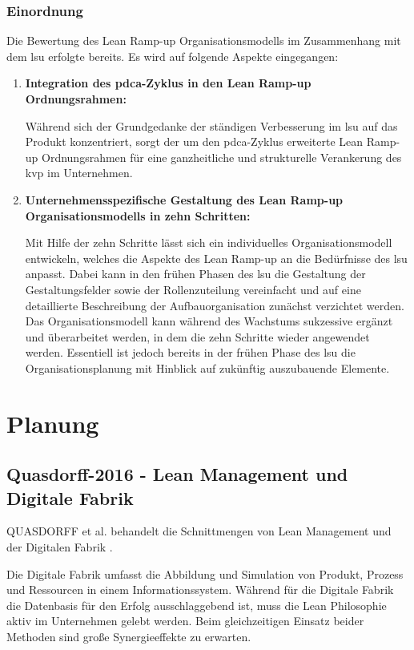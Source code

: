 \subsubsection{Einordnung}
Die Bewertung des Lean Ramp-up Organisationsmodells im Zusammenhang mit dem \gls{lsu} erfolgte bereits. Es wird auf folgende Aspekte eingegangen: 
\begin{enumerate}
 \item \textbf{Integration des \gls{pdca}-Zyklus in den Lean Ramp-up Ordnungsrahmen: }

 
 Während sich der Grundgedanke der ständigen Verbesserung im \gls{lsu} auf das Produkt konzentriert, sorgt der um den \gls{pdca}-Zyklus erweiterte Lean Ramp-up Ordnungsrahmen für eine ganzheitliche und strukturelle Verankerung des \gls{kvp} im Unternehmen. 
 
 \item \textbf{Unternehmensspezifische Gestaltung des Lean Ramp-up Organisationsmodells in zehn Schritten: }
 
 Mit Hilfe der zehn Schritte lässt sich ein individuelles Organisationsmodell entwickeln, welches die Aspekte des Lean Ramp-up an die Bedürfnisse des \gls{lsu} anpasst. Dabei kann in den frühen Phasen des \gls{lsu} die Gestaltung der Gestaltungsfelder sowie der Rollenzuteilung vereinfacht und auf eine detaillierte Beschreibung der Aufbauorganisation zunächst verzichtet werden. Das Organisationsmodell kann während des Wachstums sukzessive ergänzt und überarbeitet werden, in dem die zehn Schritte wieder angewendet werden. Essentiell ist jedoch bereits in der frühen Phase des \gls{lsu} die Organisationsplanung mit Hinblick auf zukünftig auszubauende Elemente. 
 \end{enumerate}
 
\section{Planung}
\subsection*{Quasdorff-2016 - Lean Management und Digitale Fabrik}

QUASDORFF et al. behandelt die Schnittmengen von Lean Management und der Digitalen Fabrik \cite{Quasdorff2016}. 

Die Digitale Fabrik umfasst die Abbildung und Simulation von Produkt, Prozess und Ressourcen in einem Informationssystem. Während für die Digitale Fabrik die Datenbasis für den Erfolg ausschlaggebend ist, muss die Lean Philosophie aktiv im Unternehmen gelebt werden. Beim gleichzeitigen Einsatz beider Methoden sind große Synergieeffekte zu erwarten. 

